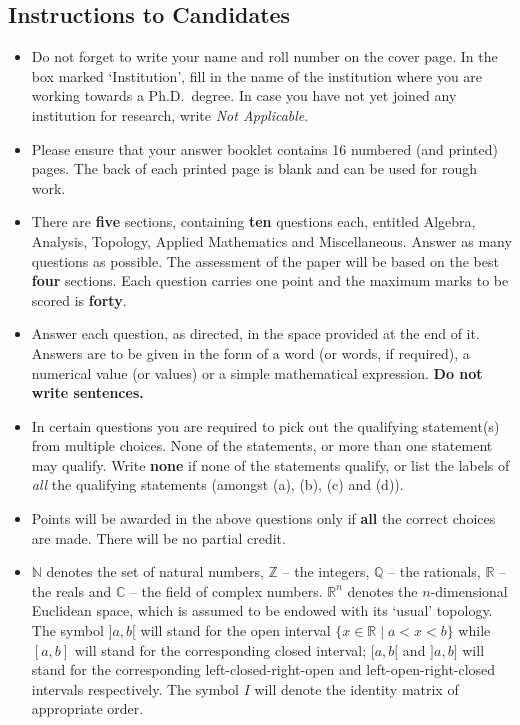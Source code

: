 \documentclass[11pt,a4paper]{article}
\newcommand{\N}{\mathbb{N}}
\newcommand{\Z}{\mathbb{Z}}
\newcommand{\Q}{\mathbb{Q}}
\newcommand{\R}{\mathbb{R}}
\newcommand{\C}{\mathbb{C}}
\begin{document}
\subsection*{Instructions to Candidates}
\begin{itemize}
  \item Do not forget to write your name and roll number on the cover page. In the box marked `Institution', fill in the name of the institution where you are working towards a Ph.D.\ degree. In case you have not yet joined any institution for research, write \emph{Not Applicable}.
  \item Please ensure that your answer booklet contains 16 numbered (and printed) pages. The back of each printed page is blank and can be used for rough work.
  \item There are \textbf{five} sections, containing \textbf{ten} questions each, entitled Algebra, Analysis, Topology, Applied Mathematics and Miscellaneous. Answer as many questions as possible. The assessment of the paper will be based on the best \textbf{four} sections. Each question carries one point and the maximum marks to be scored is \textbf{forty}.
  \item Answer each question, as directed, in the space provided at the end of it. Answers are to be given in the form of a word (or words, if required), a numerical value (or values) or a simple mathematical expression. \textbf{Do not write sentences.}
  \item In certain questions you are required to pick out the qualifying statement(s) from multiple choices. None of the statements, or more than one statement may qualify. Write \textbf{none} if none of the statements qualify, or list the labels of \emph{all} the qualifying statements (amongst (a), (b), (c) and (d)).
  \item Points will be awarded in the above questions only if \textbf{all} the correct choices are made. There will be no partial credit.
  \item $\N$ denotes the set of natural numbers, $\Z$ -- the integers, $\Q$ -- the rationals, $\R$ -- the reals and $\C$ -- the field of complex numbers. $\R^n$ denotes the $n$-dimensional Euclidean space, which is assumed to be endowed with its `usual' topology. The symbol $]a, b[$ will stand for the open interval $\{x \in \R \mid a < x < b\}$ while $[a, b]$ will stand for the corresponding closed interval; $[a, b[$ and $]a, b]$ will stand for the corresponding left-closed-right-open and left-open-right-closed intervals respectively. The symbol $I$ will denote the identity matrix of appropriate order.
\end{itemize}
\end{document}
